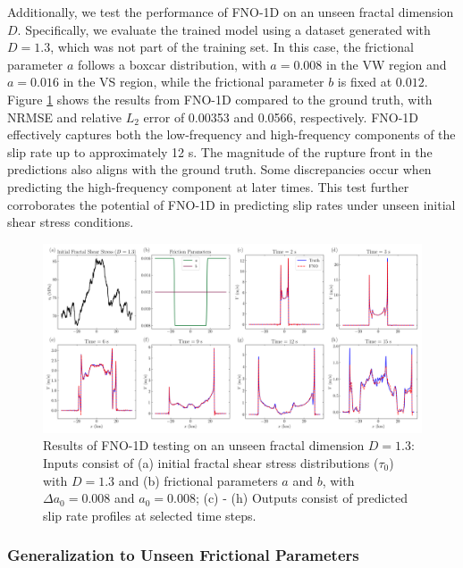 \documentclass[draft]{agujournal2019}
\begin{document}
Additionally, we test the performance of FNO-1D on an unseen fractal dimension \(D\). Specifically, we evaluate the trained model using a dataset generated with \(D = 1.3\), which was not part of the training set. In this case, the frictional parameter \(a\) follows a boxcar distribution, with \(a = 0.008\) in the VW region and \(a = 0.016\) in the VS region, while the frictional parameter \(b\) is fixed at \(0.012\). Figure \ref{fig:2D_unseen_d} shows the results from FNO-1D compared to the ground truth, with NRMSE and relative \(L_2\) error of 0.00353 and 0.0566, respectively. FNO-1D effectively captures both the low-frequency and high-frequency components of the slip rate up to approximately 12 s. The magnitude of the rupture front in the predictions also aligns with the ground truth. Some discrepancies occur when predicting the high-frequency component at later times. This test further corroborates the potential of FNO-1D in predicting slip rates under unseen initial shear stress conditions.

\begin{figure}
\centering
\includegraphics[width=1.0\linewidth]{2D_fractal_dim13.png}
\caption{\label{fig:2D_unseen_d}Results of FNO-1D testing on an unseen fractal dimension \(D = 1.3\): Inputs consist of (a) initial fractal shear stress distributions (\(\tau_{0}\)) with \(D = 1.3\) and (b) frictional parameters \(a\) and \(b\), with \(\Delta a_{0} = 0.008\) and \(a_{0} = 0.008\); (c) - (h) Outputs consist of predicted slip rate profiles at selected time steps.
}
\end{figure}

\subsubsection{Generalization to Unseen Frictional Parameters}
\label{sec:FNO-1D_unseen_ab}
\end{document}
